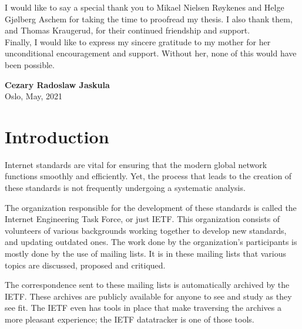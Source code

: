 \documentclass[a4paper,english]{report}
\begin{document}
I would like to say a special thank you to Mikael Nielsen Røykenes and Helge Gjølberg Aschem for taking the time to proofread my thesis. I also thank them, and Thomas Kraugerud, for their continued friendship and support. \\

Finally, I would like to express my sincere gratitude to my mother for her unconditional encouragement and support. Without her, none of this would have been possible.


\begin{flushright}
\textbf{Cezary Radoslaw Jaskula}\\

Oslo, May, 2021
\end{flushright}




\tableofcontents



 \chapter{Introduction}


Internet standards are vital for ensuring that the modern global network functions smoothly and efficiently. Yet, the process that leads to the creation of these standards is not frequently undergoing a systematic analysis. 

The organization responsible for the development of these standards is called the Internet Engineering Task Force, or just IETF. This organization consists of volunteers of various backgrounds working together to develop new standards, and updating outdated ones. The work done by the organization's participants is mostly done by the use of mailing lists. It is in these mailing lists that various topics are discussed, proposed and critiqued.

The correspondence sent to these mailing lists is automatically archived by the IETF. These archives are publicly available for anyone to see and study as they see fit. 
The IETF even has tools in place that make traversing the archives a more pleasant experience; the IETF datatracker is one of those tools.
\end{document}
